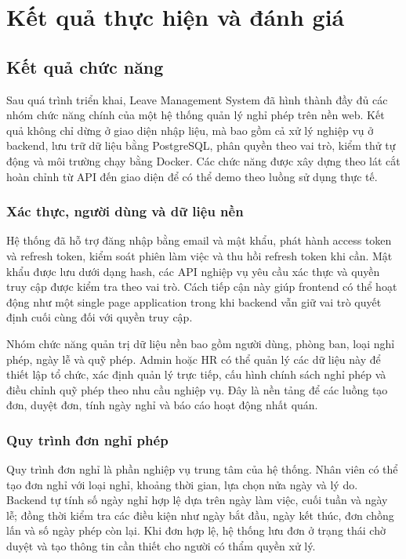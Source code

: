 \chapter{Kết quả thực hiện và đánh giá}

\section{Kết quả chức năng}
Sau quá trình triển khai, Leave Management System đã hình thành đầy đủ các nhóm chức năng chính của một hệ thống quản lý nghỉ phép trên nền web. Kết quả không chỉ dừng ở giao diện nhập liệu, mà bao gồm cả xử lý nghiệp vụ ở backend, lưu trữ dữ liệu bằng PostgreSQL, phân quyền theo vai trò, kiểm thử tự động và môi trường chạy bằng Docker. Các chức năng được xây dựng theo lát cắt hoàn chỉnh từ API đến giao diện để có thể demo theo luồng sử dụng thực tế.

\subsection{Xác thực, người dùng và dữ liệu nền}
Hệ thống đã hỗ trợ đăng nhập bằng email và mật khẩu, phát hành access token và refresh token, kiểm soát phiên làm việc và thu hồi refresh token khi cần. Mật khẩu được lưu dưới dạng hash, các API nghiệp vụ yêu cầu xác thực và quyền truy cập được kiểm tra theo vai trò. Cách tiếp cận này giúp frontend có thể hoạt động như một single page application trong khi backend vẫn giữ vai trò quyết định cuối cùng đối với quyền truy cập.

Nhóm chức năng quản trị dữ liệu nền bao gồm người dùng, phòng ban, loại nghỉ phép, ngày lễ và quỹ phép. Admin hoặc HR có thể quản lý các dữ liệu này để thiết lập tổ chức, xác định quản lý trực tiếp, cấu hình chính sách nghỉ phép và điều chỉnh quỹ phép theo nhu cầu nghiệp vụ. Đây là nền tảng để các luồng tạo đơn, duyệt đơn, tính ngày nghỉ và báo cáo hoạt động nhất quán.

\subsection{Quy trình đơn nghỉ phép}
Quy trình đơn nghỉ là phần nghiệp vụ trung tâm của hệ thống. Nhân viên có thể tạo đơn nghỉ với loại nghỉ, khoảng thời gian, lựa chọn nửa ngày và lý do. Backend tự tính số ngày nghỉ hợp lệ dựa trên ngày làm việc, cuối tuần và ngày lễ; đồng thời kiểm tra các điều kiện như ngày bắt đầu, ngày kết thúc, đơn chồng lấn và số ngày phép còn lại. Khi đơn hợp lệ, hệ thống lưu đơn ở trạng thái chờ duyệt và tạo thông tin cần thiết cho người có thẩm quyền xử lý.

